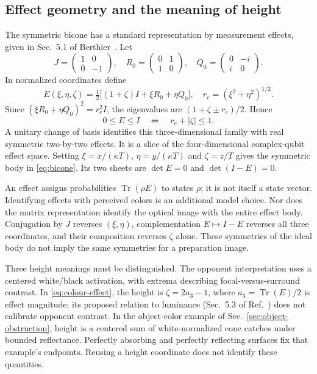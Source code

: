 \documentclass[9pt,twocolumn,twoside]{opticajnl}
\theoremstyle{plain}
\begin{document}
\subsection{Effect geometry and the meaning of height}
\label{sec:effect-body}
The symmetric bicone has a standard representation by measurement effects, given in Sec.~5.1 of Berthier~\cite{Berthier2020}. Let
\begin{equation}
 J=\begin{pmatrix}1&0\\0&-1\end{pmatrix},\quad
 R_0=\begin{pmatrix}0&1\\1&0\end{pmatrix},\quad
 Q_0=\begin{pmatrix}0&-i\\i&0\end{pmatrix}.
 \label{eq:effect-pauli}
\end{equation}
In normalized coordinates define
\begin{equation}
 E(\xi,\eta,\zeta)=\tfrac12\bigl[(1+\zeta)I+\xi R_0+\eta Q_0\bigr],
 \quad r_e=(\xi^2+\eta^2)^{1/2}.
 \label{eq:colour-effect}
\end{equation}
Since $(\xi R_0+\eta Q_0)^2=r_e^2I$, the eigenvalues are $(1+\zeta\pm r_e)/2$. Hence
\begin{equation}
 0\leq E\leq I\quad\Longleftrightarrow\quad r_e+|\zeta|\leq1.
 \label{eq:effect-bicone}
\end{equation}
A unitary change of basis identifies this three-dimensional family with real symmetric two-by-two effects. It is a slice of the four-dimensional complex-qubit effect space. Setting $\xi=x/(\kappa T)$, $\eta=y/(\kappa T)$ and $\zeta=z/T$ gives the symmetric body in \eqref{eq:bicone}. Its two sheets are $\det E=0$ and $\det(I-E)=0$.

An effect assigns probabilities $\operatorname{Tr}(\rho E)$ to states $\rho$; it is not itself a state vector. Identifying effects with perceived colors is an additional model choice. Nor does the matrix representation identify the optical image with the entire effect body. Conjugation by $J$ reverses $(\xi,\eta)$, complementation $E\mapsto I-E$ reverses all three coordinates, and their composition reverses $\zeta$ alone. These symmetries of the ideal body do not imply the same symmetries for a preparation image.

Three height meanings must be distinguished. The opponent interpretation uses a centered white/black activation, with extrema describing focal-versus-surround contrast. In \eqref{eq:colour-effect}, the height is $\zeta=2a_3-1$, where $a_3=\operatorname{Tr}(E)/2$ is effect magnitude; its proposed relation to luminance (Sec.~5.3 of Ref.~\cite{BerthierProvenzi2022}) does not calibrate opponent contrast. In the object-color example of Sec.~\ref{sec:object-obstruction}, height is a centered sum of white-normalized cone catches under bounded reflectance. Perfectly absorbing and perfectly reflecting surfaces fix that example's endpoints. Reusing a height coordinate does not identify these quantities.
\end{document}
